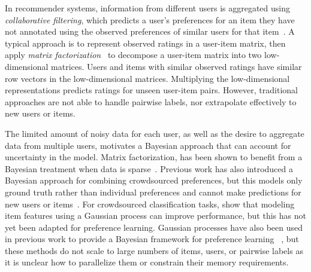In recommender systems, information from different users is aggregated using \emph{collaborative filtering},  
which predicts a user's preferences for an item they have not annotated using the observed preferences of 
similar users for that item~\citep{resnick1997recommender}.
A typical approach is to represent observed ratings in a user-item matrix,
then apply \emph{matrix factorization}~\citep{koren2009matrix}
to decompose a user-item matrix into two low-dimensional matrices.
Users and items with similar observed ratings have similar row vectors in the low-dimensional
matrices. Multiplying the low-dimensional representations predicts ratings for unseen
user-item pairs. 
However, traditional approaches are not able to handle pairwise labels,
nor extrapolate effectively to new users or items.

The limited amount of noisy data for each user,
as well as the desire to aggregate data from multiple users,
motivates a Bayesian approach that can account for uncertainty in the model.
Matrix factorization, has been shown to benefit from a Bayesian treatment when data is sparse~\citep{salakhutdinov2008bayesian}. 
Previous work has also introduced a Bayesian approach for combining crowdsourced preferences, but this models only ground truth rather than individual preferences and cannot make predictions for new users or items~\citep{chen2013pairwise}.
For crowdsourced classification tasks, \citet{simpson2017bayesian} show that modeling item features using a Gaussian process can improve performance, but this has not yet been adapted for preference learning.
Gaussian processes have also been used in previous work to provide a Bayesian framework for preference learning
~\citep{chu2005preference,houlsby2012collaborative,khan2014scalable}, 
but these methods do not scale to large numbers of items, users, or
pairwise labels as it is unclear how to parallelize them or constrain their memory requirements.

